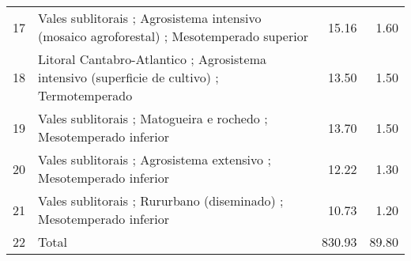 \begin{table}[p]
\begin{tabular}{rlrr}
  17 & Vales sublitorais ; Agrosistema intensivo (mosaico agroforestal) ; Mesotemperado superior & 15.16 & 1.60 \\ 
  18 & Litoral Cantabro-Atlantico ; Agrosistema intensivo (superficie de cultivo) ; Termotemperado & 13.50 & 1.50 \\ 
  19 & Vales sublitorais ; Matogueira e rochedo ; Mesotemperado inferior & 13.70 & 1.50 \\ 
  20 & Vales sublitorais ; Agrosistema extensivo ; Mesotemperado inferior & 12.22 & 1.30 \\ 
  21 & Vales sublitorais ; Rururbano (diseminado) ; Mesotemperado inferior & 10.73 & 1.20 \\ 
  22 & Total & 830.93 & 89.80 \\ 
   \hline
\end{tabular}
\end{table}
